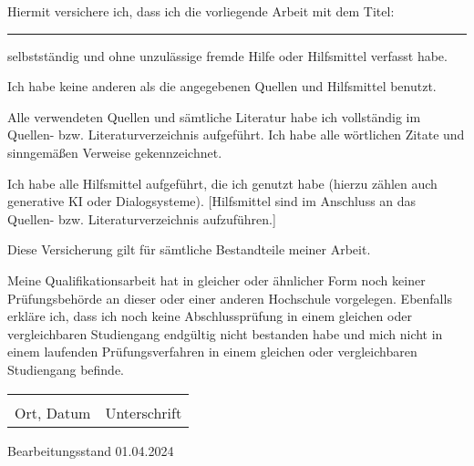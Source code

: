 \documentclass[oneside,12pt,a4paper]{scrreprt} %
\begin{document}
\vspace{0.5cm}

\noindent
Hiermit versichere ich, dass ich die vorliegende Arbeit mit dem Titel:

\vspace{0.5cm}

\noindent
\hrule
\noindent
selbstständig und ohne unzulässige fremde Hilfe oder Hilfsmittel verfasst habe.

\noindent
Ich habe keine anderen als die angegebenen Quellen und Hilfsmittel benutzt.

\noindent
Alle verwendeten Quellen und sämtliche Literatur habe ich vollständig im Quellen- bzw. Literaturverzeichnis aufgeführt. Ich habe alle wörtlichen Zitate und sinngemäßen Verweise gekennzeichnet.

\noindent
Ich habe alle Hilfsmittel aufgeführt, die ich genutzt habe (hierzu zählen auch generative KI oder Dialogsysteme). [Hilfsmittel sind im Anschluss an das Quellen- bzw. Literaturverzeichnis aufzuführen.]

\noindent
Diese Versicherung gilt für sämtliche Bestandteile meiner Arbeit.

\noindent
Meine Qualifikationsarbeit hat in gleicher oder ähnlicher Form noch keiner Prüfungsbehörde an dieser oder einer anderen Hochschule vorgelegen. Ebenfalls erkläre ich, dass ich noch keine Abschlussprüfung in einem gleichen oder vergleichbaren Studiengang endgültig nicht bestanden habe und mich nicht in einem laufenden Prüfungsverfahren in einem gleichen oder vergleichbaren Studiengang befinde.

\vspace{2cm}

\noindent
\begin{tabular}{@{}p{5cm}p{5cm}@{}}
\hrulefill & \hrulefill \\
Ort, Datum & Unterschrift
\end{tabular}
\vfill
Bearbeitungsstand 01.04.2024
\end{document}
